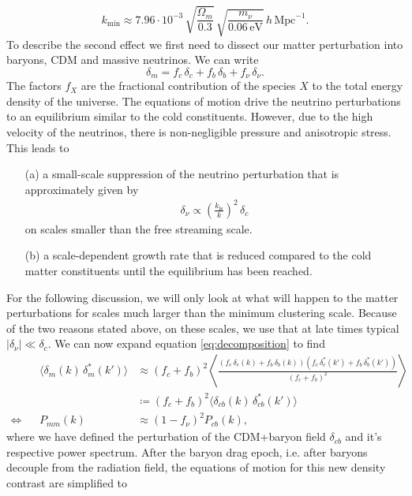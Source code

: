 \documentclass[../main.tex]{subfiles}
\begin{document}
\begin{equation}
    k_\mathrm{min} \approx 7.96\cdot10^{-3}\,\sqrt{\frac{\Omega_m}{0.3}}\,\sqrt{\frac{m_\nu}{0.06\,\mathrm{eV}}}\,h\,\mathrm{Mpc}^{-1}.
\end{equation}
To describe the second effect we first need to dissect our matter perturbation into baryons, CDM and massive neutrinos. We can write 
\begin{equation}
    \label{eq:decomposition}
    \delta_m = f_c \,\delta_c + f_b\, \delta_b + f_\nu\,\delta_\nu.
\end{equation}
The factors $f_X$ are the fractional contribution of the species $X$ to the total energy density of the universe. The equations of motion drive the neutrino perturbations to an equilibrium similar to the cold constituents. However, due to the high velocity of the neutrinos, there is non-negligible pressure and anisotropic stress. 
This leads to \begin{itemize}
    \item[(a)] a small-scale suppression of the neutrino perturbation that is approximately given by 
    \begin{align*}
        \delta_\nu \propto \left(\frac{k_\mathrm{fs}}{k}\right)^2\,\delta_c
    \end{align*} 
    on scales smaller than the free streaming scale.
    \item[(b)] a scale-dependent growth rate that is reduced compared to the cold matter constituents until the equilibrium has been reached.
\end{itemize}
For the following discussion, we will only look at what will happen to the matter perturbations for scales much larger than the minimum clustering scale. Because of the two reasons stated above, on these scales, we use that at late times typical $|\delta_\nu|\ll\delta_c$. We can now expand equation \ref{eq:decomposition} to find \begin{align}
 &&\langle \delta_m(k)\,\delta^*_m(k')\rangle &\approx (f_c+f_b)^2\left\langle\frac{(f_c \,\delta_c(k) + f_b\, \delta_b(k))(f_c \,\delta_c^*(k') + f_b\, \delta_b^*(k'))}{(f_c + f_b)^2}\right\rangle \nonumber\\
&&&\coloneqq (f_c+f_b)^2 \langle \delta_{cb}(k)\,\delta_{cb}^*(k') \rangle \\
\Longleftrightarrow && P_{mm}(k) &\approx (1-f_\nu)^2 P_{cb}(k),
\end{align}
where we have defined the perturbation of the CDM+baryon field $\delta_{cb}$ and it's respective power spectrum. After the baryon drag epoch, i.e. after baryons decouple from the radiation field, the equations of motion for this new density contrast are simplified to 
\end{document}
